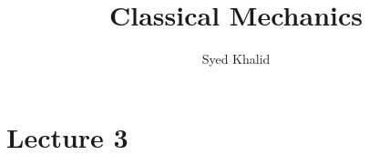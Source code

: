 \documentclass{article}
\title{\textbf{Classical Mechanics}}
\author{Syed Khalid}
\begin{document}
\maketitle

\section{Lecture 3}%
  \label{sec:Lecture 3}
  
\end{document}
